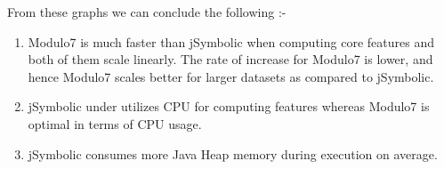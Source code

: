 \newpage

\noindent From these graphs we can conclude the following :-

\begin{enumerate}
\item Modulo7 is much faster than jSymbolic when computing core features and both of them scale linearly. The rate of increase for Modulo7 is lower, and hence Modulo7 scales better for larger datasets as compared to jSymbolic.
\item jSymbolic under utilizes CPU for computing features whereas Modulo7 is optimal in terms of CPU usage.
\item jSymbolic consumes more Java Heap memory during execution on average. 
\end{enumerate}


 


